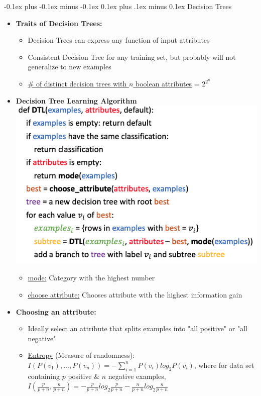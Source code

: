 \documentclass[landscape]{article}
\makeatletter
\renewcommand{\subsection}{\@startsection{subsection}{2}{0mm}%
  {-0.1ex plus -0.1ex minus -0.1ex}%
  {0.1ex plus .1ex minus 0.1ex}%
{\normalfont\scriptsize\bfseries}}
\makeatother
\begin{document}
\begin{multicols*}{5}
    \subsection{Decision Trees}
    \begin{itemize}
      \item \textbf{Traits of Decision Trees:}
      \begin{itemize}
        \item Decision Trees can express any function of input attributes
        \item Consistent Decision Tree for any training set, but probably will not generalize to new examples
        \item \underline{\# of distinct decision trees with $n$ boolean attributes} = $2^{2^n}$
      \end{itemize}
      \item \textbf{Decision Tree Learning Algorithm}
      \includegraphics[width=0.8\linewidth]{13_decision_tree.png}
      \begin{itemize}
        \item \underline{mode:} Category with the highest number
        \item \underline{choose attribute:} Chooses attribute with the highest information gain
      \end{itemize}
      \item \textbf{Choosing an attribute:}
      \begin{itemize}
        \item Ideally select an attribute that splits examples into "all positive" or "all negative"
        \item \underline{Entropy} (Measure of randomness): $I(P(v_1),...,P(v_n)) = - \sum_{i=1}^{n}P(v_i)log_2P(v_i)$, where for data set containing $p$ positive \& $n$ negative examples, $I(\frac{p}{p+n}, \frac{n}{p+n}) = -\frac{p}{p+n}log_2\frac{p}{p+n}-\frac{n}{p+n}log_2\frac{n}{p+n}$ \\

\end{itemize}
\end{itemize}
\end{multicols*}
\end{document}
